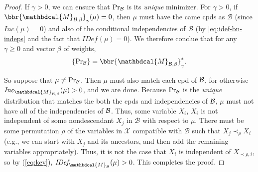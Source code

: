 \documentclass[letterpaper]{article} %
\theoremstyle{plain}
\theoremstyle{definition}
\theoremstyle{remark}
\let\H\relax
\DeclareMathOperator{\H}{\mathrm{H}} %
\newcommand{\dg}[1]{\mathbdcal{#1}}
\newcommand{\IDef}[1]{\mathit{IDef}_{\!#1}}
\newcommand\Inc{\mathit{Inc}}
\newcommand{\PDGof}[1]{{\dg M}_{#1}}
\begin{document}
\begin{proof}
{If $\gamma > 0$, we can ensure that $\Pr_{\cal B}$ is its \emph{unique} minimizer. For $\gamma > 0$, if $\bbr{\PDGof{\mathcal B, \beta}}_\gamma(\mu) = 0$, then $\mu$ must have the came cpds as $\mathcal B$ (since $\Inc(\mu) = 0$) and also of the conditional independencies of $\mathcal B$ (by \eqref{eq:idef-bn-indeps} and the fact that $\IDef{}(\mu) = 0$).
We therefore conclue that for any $\gamma\geq0$ and vector $\beta$ of weights, 
\[ \{ \Pr\nolimits_{\cal B} \} = \bbr{\PDGof{\mathcal B, \beta}}_\gamma^* .\]

	
}
So suppose that $\mu \ne \Pr_{\cal B}$. 
Then $\mu$ must also match each cpd of $\cal B$,
for otherwise $\Inc_{\PDGof{\mathcal B,
\beta}}(\mu) > 0$, and we are done.  
Because $\Pr_{\cal B}$ is the \emph{unique} distribution that matches the 
both the cpds and independencies of $\cal B$, $\mu$ must not have all of the 
independencies of $\cal B$. 
Thus,
some variable $X_i$, $X_i$ is not independent of some nondescendant $X_j$ in
$\mathcal B$ with respect to $\mu$.  There must be some permutation
$\rho$ of the variables in $\mathcal X$ compatible with ${\mathcal B}$
such that $X_j \prec_{\rho} X_i$ (e.g., we can start with $X_j$ and
its ancestors, and then add the remaining variables appropriately).
Thus, it is not the case that $X_i$ is independent of $X_{\prec \rho,
  i}$, so by (\ref{eq:key}), $\IDef{\PDGof{\mathcal B}}(\mu) > 0$.
This completes the proof.
\end{proof}
\end{document}
